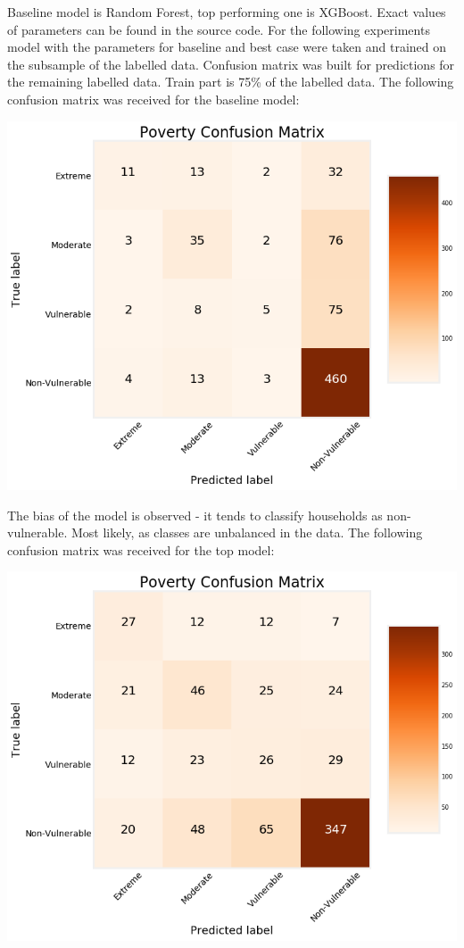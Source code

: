     Baseline model is Random Forest, top performing one is XGBoost. Exact values of parameters can be found in the source code. %
    For the following experiments model with the parameters for baseline and best case were taken and trained on the subsample of the labelled data. Confusion matrix was built for predictions for the remaining labelled data. Train part is 75\% of the labelled data. The following confusion matrix was received for the baseline model:
    \begin{center}
        \includegraphics[width=\textwidth]{images/confusion_matrix_rf.png}
    \end{center}

    The bias of the model is observed - it tends to classify households as non-vulnerable. Most likely, as classes are unbalanced in the data.
    The following confusion matrix was received for the top model:
    \begin{center}
        \includegraphics[width=\textwidth]{images/confusion_matrix_lgbm.png}
    \end{center}


